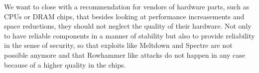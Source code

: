 We want to close with a recommendation for vendors of hardware parts, such as
CPUs or DRAM chips, that besides looking at performance increasements and space
reductions, they should not neglect the quality of their hardware. Not only to
have reliable components in a manner of stability but also to provide
reliability in the sense of security, so that exploits like Meltdown and Spectre
are not possible anymore and that Rowhammer like attacks do not happen in any
case because of a higher quality in the chips.

